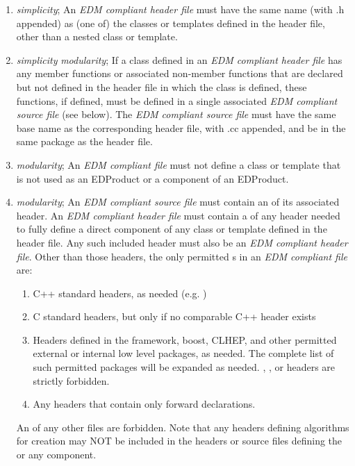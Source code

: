 \documentclass[draftmode]{memarticle}
\newcommand{\Pool}{\productname{Pool}}
\newcommand{\Root}{\productname{Root}}
\newcommand{\Seal}{\productname{Seal}}
\newcommand{\EDProduct}{\classname{ED\-Product}}
\begin{document}
\begin{enumerate}
	\item \emph{simplicity}; An \emph{EDM compliant header file} must have the same name (with .h appended) as (one of) the classes or templates defined in the header file, other than a nested class or template.

	\item \emph{simplicity} \emph{modularity}; If a class defined in an \emph{EDM compliant header file} has any member functions or associated non-member functions that are declared but not defined in the header file in which the class is defined, these functions, if defined, must be defined in a single associated \emph{EDM compliant source file} (see below).  The \emph{EDM compliant source file} must have the same base name as the corresponding header file, with .cc appended, and be in the same package as the header file.

	\item \emph{modularity}; An \emph{EDM compliant file} must not define a class or template that is not used as an EDProduct or a component of an EDProduct.

	\item \emph{modularity}; An \emph{EDM compliant source file} must contain an  of its associated header.  An \emph{EDM compliant header file} must contain a  of any header needed to fully define a direct component of any class or template defined in the header file.  Any such included header must also be an \emph{EDM compliant header file}.  Other than those headers, the only permitted s in an \emph{EDM compliant file} are:
	\begin{enumerate}
		\item C++ standard headers, as needed (e.g. )

		\item C standard headers, but only if no comparable C++ header exists

		\item Headers defined in the framework, boost, CLHEP, and other permitted external or internal low level packages, as needed.  The complete list of such permitted packages will be expanded as needed.  \Pool, \Seal, or \Root headers are strictly forbidden.

		\item Any headers that contain only forward declarations.

	\end{enumerate}
	An  of any other files are forbidden.  Note that any headers defining algorithms for \EDProduct creation may NOT be included in the headers or source files defining the \EDProduct or any component.

\end{enumerate}
\end{document}
